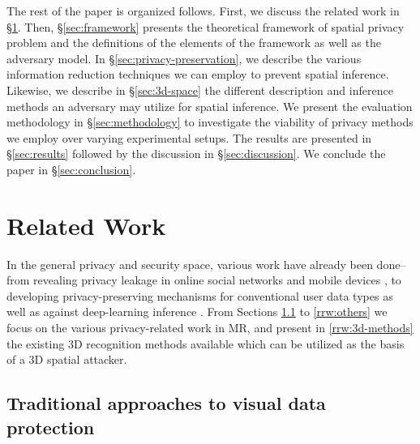 The rest of the paper is organized follows. First, we discuss the related work in \S\ref{sec:related-work}. Then, \S\ref{sec:framework} presents the theoretical framework of spatial privacy problem and the definitions of the elements of the framework as well as the adversary model. In \S\ref{sec:privacy-preservation}, we describe the various information reduction techniques we can employ to prevent spatial inference. Likewise, we describe in \S\ref{sec:3d-space} the different description and inference methods an adversary may utilize for spatial inference. We present the evaluation methodology in \S\ref{sec:methodology} to investigate the viability of privacy methods we employ over varying experimental setups. The results are presented in \S\ref{sec:results} followed by the discussion in \S\ref{sec:discussion}. We conclude the paper in \S\ref{sec:conclusion}. %

\section{Related Work}\label{sec:related-work}

In the general privacy and security space, various work have already been done--from revealing privacy leakage in online social networks \cite{krishnamurthy2010privacy} and mobile devices \cite{ren2016recon}, to developing privacy-preserving mechanisms for conventional user data types \cite{sweeney2002k, mcsherry2007mechanism, dwork2014algorithmic} as well as against deep-learning inference \cite{shokri2015privacy, abadi2016deep}. From Sections \ref{rrw:vision} to \ref{rrw:others} we focus on the various privacy-related work in MR, and present in \ref{rrw:3d-methods} the existing 3D recognition methods available which can be utilized as the basis of a 3D spatial attacker.

\subsection{Traditional approaches to visual data protection}\label{rrw:vision}


